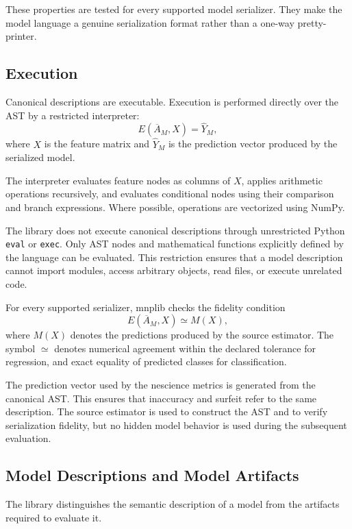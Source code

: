 These properties are tested for every supported model serializer. They make
the model language a genuine serialization format rather than a one-way
pretty-printer.

\subsection{Execution}


Canonical descriptions are executable. Execution is performed directly over
the AST by a restricted interpreter:
\[
E(\overline{A}_M,X)=\widehat{Y}_M,
\]
where \(X\) is the feature matrix and \(\widehat{Y}_M\) is the prediction
vector produced by the serialized model.

The interpreter evaluates feature nodes as columns of \(X\), applies arithmetic
operations recursively, and evaluates conditional nodes using their comparison
and branch expressions. Where possible, operations are vectorized using NumPy.

The library does not execute canonical descriptions through unrestricted
Python \texttt{eval} or \texttt{exec}. Only AST nodes and mathematical
functions explicitly defined by the language can be evaluated. This restriction
ensures that a model description cannot import modules, access arbitrary
objects, read files, or execute unrelated code.

For every supported serializer, mnplib checks the fidelity condition
\[
E(\overline{A}_M,X)\simeq M(X),
\]
where \(M(X)\) denotes the predictions produced by the source estimator. The
symbol \(\simeq\) denotes numerical agreement within the declared tolerance
for regression, and exact equality of predicted classes for classification.

The prediction vector used by the nescience metrics is generated from the
canonical AST. This ensures that inaccuracy and surfeit refer to the same
description. The source estimator is used to construct the AST and to verify
serialization fidelity, but no hidden model behavior is used during the
subsequent evaluation.

\subsection{Model Descriptions and Model Artifacts}

The library distinguishes the semantic description of a model from the
artifacts required to evaluate it.

